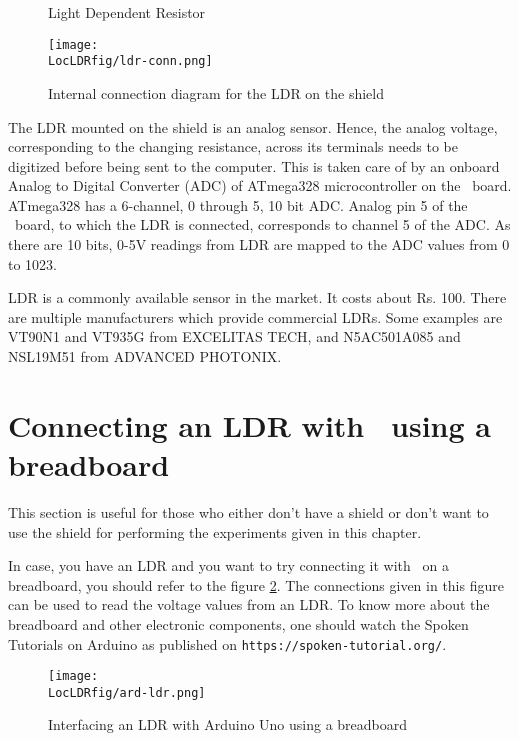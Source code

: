 \begin{figure}
\centering
{} \hfill
{}
\caption{Light Dependent Resistor}
\end{figure}

\begin{figure}
\centering
\texttt{[image: \\LocLDRfig/ldr-conn.png]}
\caption{Internal connection diagram for the LDR on the shield}
\label{fig:ldrconn}
\end{figure}

The LDR mounted on the shield is an analog sensor. Hence, the analog voltage, corresponding to the changing resistance, across its terminals needs to be digitized before being sent to the computer. This is taken care of by an onboard Analog to Digital Converter (ADC) of ATmega328 microcontroller on the \arduino\
board. ATmega328 has a 6-channel, 0 through 5, 10 bit ADC. Analog pin
5 of the \arduino\ board, to which the LDR is connected, corresponds
to channel 5 of the ADC.  As there are 10 bits, 0-5V readings from LDR
are mapped to the ADC values from 0 to 1023. 

LDR is a commonly available sensor in the market. It costs about
Rs. 100. There are multiple manufacturers which provide commercial
LDRs.  Some examples are VT90N1 and VT935G from EXCELITAS TECH, and
N5AC501A085 and NSL19M51 from ADVANCED PHOTONIX. 

\section{Connecting an LDR with \arduino\ using a breadboard}
This section is useful for those who either don't have a shield or don't want to use the shield
for performing the experiments given in this chapter. 

In case, you have an LDR and you want to try connecting it with \arduino\ on a breadboard, you should
refer to the figure \ref{fig:ard-ldr-bread}. The connections given in this 
figure can be used to read the voltage values from an LDR. To know more about the 
breadboard and other electronic components, one should watch the Spoken Tutorials on Arduino as published on 
  {\tt https://spoken-tutorial.org/}. 

\begin{figure}
  \centering
  \texttt{[image: \\LocLDRfig/ard-ldr.png]}
  \caption{Interfacing an LDR with Arduino Uno using a breadboard}
  \label{fig:ard-ldr-bread}
\end{figure}

